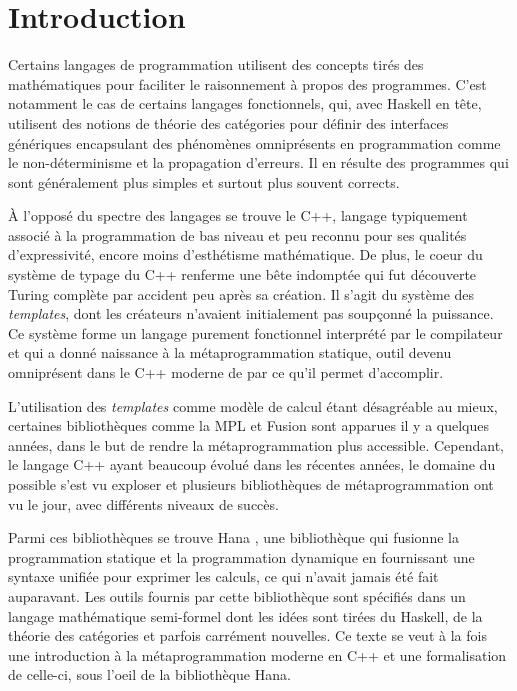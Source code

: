 \section{Introduction}
Certains langages de programmation utilisent des concepts tirés des
mathématiques pour faciliter le raisonnement à propos des programmes.
C'est notamment le cas de certains langages fonctionnels, qui, avec
Haskell en tête, utilisent des notions de théorie des catégories pour
définir des interfaces génériques encapsulant des phénomènes omniprésents
en programmation comme le non-déterminisme et la propagation d'erreurs.
Il en résulte des programmes qui sont généralement plus simples et surtout
plus souvent corrects.

À l'opposé du spectre des langages se trouve le C++, langage typiquement
associé à la programmation de bas niveau et peu reconnu pour ses qualités
d'expressivité, encore moins d'esthétisme mathématique. De plus, le coeur
du système de typage du C++ renferme une bête indomptée qui fut découverte
Turing complète par accident peu après sa création. Il s'agit du système des
\textit{templates}, dont les créateurs n'avaient initialement pas soupçonné
la puissance. Ce système forme un langage purement fonctionnel interprété par
le compilateur et qui a donné naissance à la métaprogrammation statique, outil
devenu omniprésent dans le C++ moderne de par ce qu'il permet d'accomplir.

L'utilisation des \textit{templates} comme modèle de calcul étant désagréable
au mieux, certaines bibliothèques comme la MPL \cite{mpl} et Fusion \cite{fusion}
sont apparues il y a quelques années, dans le but de rendre la métaprogrammation
plus accessible. Cependant, le langage C++ ayant beaucoup évolué dans les récentes
années, le domaine du possible s'est vu exploser et plusieurs bibliothèques de
métaprogrammation ont vu le jour, avec différents niveaux de succès.

Parmi ces bibliothèques se trouve Hana \cite{hana}, une bibliothèque qui
fusionne la programmation statique et la programmation dynamique en fournissant
une syntaxe unifiée pour exprimer les calculs, ce qui n'avait jamais été fait
auparavant. Les outils fournis par cette bibliothèque sont spécifiés dans
un langage mathématique semi-formel dont les idées sont tirées du Haskell,
de la théorie des catégories et parfois carrément nouvelles. Ce texte se
veut à la fois une introduction à la métaprogrammation moderne en C++ et
une formalisation de celle-ci, sous l'oeil de la bibliothèque Hana.
